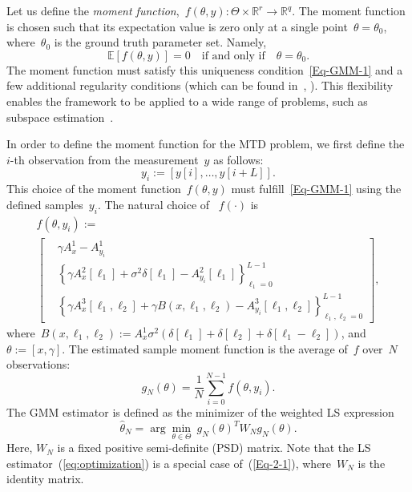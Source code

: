 \documentclass{article}
\newcommand{\E}[0]{\mathbb{E}}
\newcommand{\R}[0]{\mathbb{R}}
\begin{document}
Let us define the \textit{moment function},~\mbox{$f(\theta, y)\colon \Theta \times \R^r \to \R^q$}. The moment function is chosen such that its expectation value is zero only at a single point~$\theta=\theta_0$, where~$\theta_0$ is the ground truth parameter set. Namely,
\begin{equation}\label{Eq-GMM-1}
	\E\left[f(\theta,y)\right] = 0 \quad \text{if and only if} \quad \theta = \theta_0.
\end{equation}
The moment function must satisfy this uniqueness condition~\eqref{Eq-GMM-1} and a few additional regularity conditions (which can be found in~\cite{Hansen1982}, \cite{Hall2005} \cite{abas2021generalized}). This flexibility enables the framework to be applied to a wide range of problems, such as subspace estimation~\cite{fan2018optimal}.

In order to define the moment function for the MTD problem, we first define the $i$-th observation from the measurement~$y$ as follows:
\begin{equation}
	y_i := [y[i],\ldots, y[i+L]].
\end{equation}
This choice of the moment function~$f(\theta, y)$ must fulfill~\eqref{Eq-GMM-1} using the defined samples~$y_i$. The natural choice of ~$f(\cdot)$ is
\begin{multline} \label{Eq-GMM-2}
	f(\theta, y_i) := \\
	\begin{bmatrix}
		&\gamma A_x^1 - A_{y_i}^1\\
		&\left\{\gamma A_x^2[\ell_1] + \sigma^2 \delta[\ell_1] - A_{y_i}^2 [\ell_1]\right\}_{\ell_1 =0}^{L-1} \\
		&\left\{\gamma A_x^3[\ell_1, \ell_2] + \gamma B(x, \ell_1, \ell_2) - A_{y_i}^3[\ell_1, \ell_2]\right\}_{\ell_1, \ell_2 = 0}^{L-1}
	\end{bmatrix},
\end{multline}
where~$B(x, \ell_1, \ell_2) := A_{x}^1 \sigma^2 (\delta[\ell_1] + \delta[\ell_2] + \delta[\ell_1 - \ell_2])$, and~$\theta := [x, \gamma]$. The estimated sample moment function is the average of~$f$ over~$N$ observations:
\begin{equation}\label{Eq-2-5}
	g_N(\theta) = \frac{1}{N} \sum_{i = 0}^{N - 1} f(\theta, y_i).
\end{equation}
The GMM estimator is defined as the minimizer of the weighted LS expression
\begin{equation} \label{Eq-2-1}
	\hat{\theta}_N = \arg\min_{\theta \in \Theta} \ g_N(\theta)^T W_N g_N(\theta).
\end{equation}
Here, $W_N$ is a fixed positive semi-definite (PSD) matrix. Note that the LS estimator~(\ref{eq:optimization}) is a special case of~(\ref{Eq-2-1}), where~$W_N$ is the identity matrix.
\end{document}
